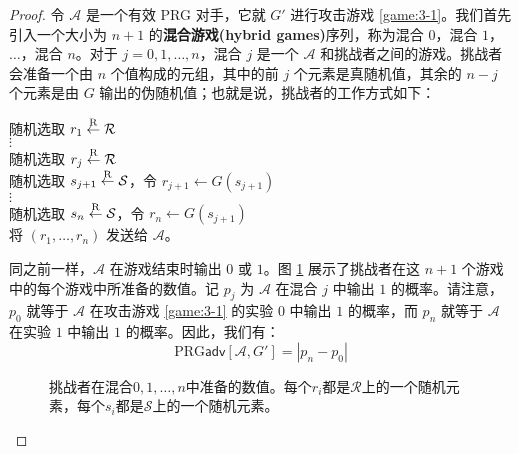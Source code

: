 \begin{proof}
令 $\mathcal A$ 是一个有效 PRG 对手，它就 $G'$ 进行攻击游戏 \ref{game:3-1}。我们首先引入一个大小为 $n+1$ 的\textbf{混合游戏(hybrid games)}序列，称为混合 $0$，混合 $1$，$\dots$，混合 $n$。对于 $j=0,1,\dots,n$，混合 $j$ 是一个 $\mathcal A$ 和挑战者之间的游戏。挑战者会准备一个由 $n$ 个值构成的元组，其中的前 $j$ 个元素是真随机值，其余的 $n-j$ 个元素是由 $G$ 输出的伪随机值；也就是说，挑战者的工作方式如下：

\vspace*{10pt}

\hspace*{5pt} 随机选取 $r_1\overset{\rm R}\leftarrow\mathcal R$\\
\hspace*{50pt} $\vdots$\\
\hspace*{26pt} 随机选取 $r_j\overset{\rm R}\leftarrow\mathcal R$\\
\hspace*{26pt} 随机选取 $s_{j+1}\overset{\rm R}\leftarrow\mathcal{S}$，令 $r_{j+1}\leftarrow G(s_{j+1})$\\
\hspace*{50pt} $\vdots$\\
\hspace*{26pt} 随机选取 $s_{n}\overset{\rm R}\leftarrow\mathcal{S}$，令 $r_{n}\leftarrow G(s_{j+1})$\\
\hspace*{26pt} 将 $(r_1,\dots,r_n)$ 发送给 $\mathcal A$。

\vspace*{10pt}

\noindent
同之前一样，$\mathcal A$ 在游戏结束时输出 $0$ 或 $1$。图 \ref{fig:3-5} 展示了挑战者在这 $n+1$ 个游戏中的每个游戏中所准备的数值。记 $p_j$ 为 $\mathcal A$ 在混合 $j$ 中输出 $1$ 的概率。请注意，$p_0$ 就等于 $\mathcal A$ 在攻击游戏 \ref{game:3-1} 的实验 $0$ 中输出 $1$ 的概率，而 $p_n$ 就等于 $\mathcal A$ 在实验 $1$ 中输出 $1$ 的概率。因此，我们有：
\begin{equation}\label{eq:3-9}
\mathrm{PRG}\mathsf{adv}[\mathcal{A},G']
=|p_n-p_0|
\end{equation}

\begin{figure}
	\centering
	
	\caption{挑战者在混合$0,1,\dots,n$中准备的数值。每个$r_i$都是$\mathcal{R}$上的一个随机元素，每个$s_i$都是$\mathcal{S}$上的一个随机元素。}
	\label{fig:3-5}
\end{figure}


\end{proof}
